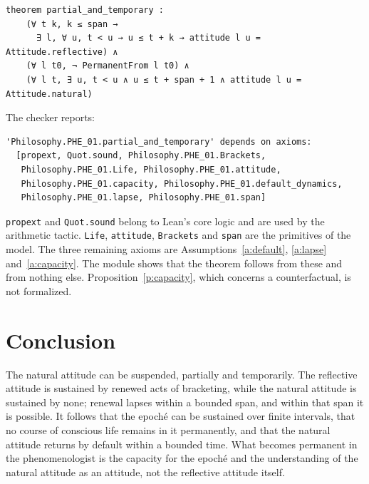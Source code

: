 \documentclass{situationist-preprint}
\begin{document}
\begin{lstlisting}
theorem partial_and_temporary :
    (∀ t k, k ≤ span →
      ∃ l, ∀ u, t < u → u ≤ t + k → attitude l u = Attitude.reflective) ∧
    (∀ l t0, ¬ PermanentFrom l t0) ∧
    (∀ l t, ∃ u, t < u ∧ u ≤ t + span + 1 ∧ attitude l u = Attitude.natural)
\end{lstlisting}

\noindent The checker reports:

\begin{lstlisting}
'Philosophy.PHE_01.partial_and_temporary' depends on axioms:
  [propext, Quot.sound, Philosophy.PHE_01.Brackets,
   Philosophy.PHE_01.Life, Philosophy.PHE_01.attitude,
   Philosophy.PHE_01.capacity, Philosophy.PHE_01.default_dynamics,
   Philosophy.PHE_01.lapse, Philosophy.PHE_01.span]
\end{lstlisting}

\noindent \texttt{propext} and \texttt{Quot.sound} belong to Lean's core logic and are used by the arithmetic tactic. \texttt{Life}, \texttt{attitude}, \texttt{Brackets} and \texttt{span} are the primitives of the model. The three remaining axioms are Assumptions~\ref{a:default}, \ref{a:lapse} and~\ref{a:capacity}. The module shows that the theorem follows from these and from nothing else. Proposition~\ref{p:capacity}, which concerns a counterfactual, is not formalized.

\section{Conclusion}

The natural attitude can be suspended, partially and temporarily. The reflective attitude is sustained by renewed acts of bracketing, while the natural attitude is sustained by none; renewal lapses within a bounded span, and within that span it is possible. It follows that the epoché can be sustained over finite intervals, that no course of conscious life remains in it permanently, and that the natural attitude returns by default within a bounded time. What becomes permanent in the phenomenologist is the capacity for the epoché and the understanding of the natural attitude as an attitude, not the reflective attitude itself.
\end{document}
